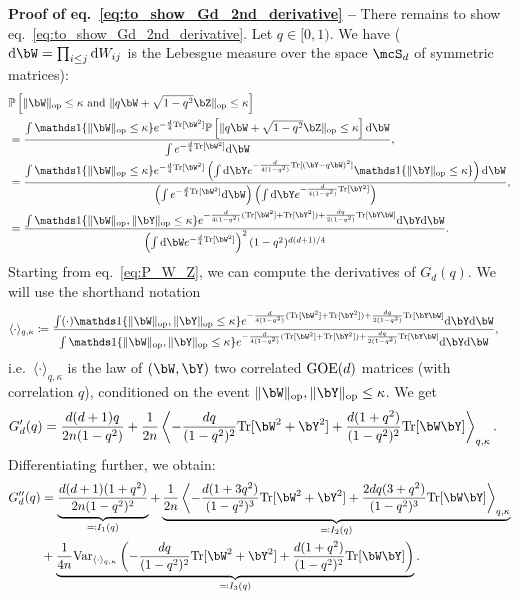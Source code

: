\myskip
\textbf{Proof of eq.~\eqref{eq:to_show_Gd_2nd_derivative} --}
There remains to show eq.~\eqref{eq:to_show_Gd_2nd_derivative}.
Let $q \in [0,1)$.
We have ($\rd \bW = \prod_{i \leq j} \rd W_{ij}$ is the Lebesgue measure over the space $\mcS_{d}$ of symmetric matrices):
\begin{align}
    \label{eq:P_W_Z}
    \nonumber
    &\bbP\left[\|\bW\|_\op \leq \kappa \textrm{ and } \|q \bW + \sqrt{1-q^2} \bZ\|_\op \leq \kappa\right] \\ 
    \nonumber
    &= \frac{\int \indi\{\|\bW\|_\op \leq \kappa\} e^{-\frac{d}{4} \Tr[\bW^2]} \bbP\left[\|q \bW + \sqrt{1-q^2} \bZ\|_\op \leq \kappa\right] \rd \bW}{\int  e^{-\frac{d}{4} \Tr[\bW^2]} \rd \bW}, \\
    \nonumber
    &= \frac{\int \indi\{\|\bW\|_\op \leq \kappa\} e^{-\frac{d}{4} \Tr[\bW^2]} \left(\int \rd \bY e^{-\frac{d}{4(1-q^2)}\Tr[(\bY - q \bW)^2]} \indi\{\|\bY\|_\op \leq \kappa\}\right) \rd \bW}{\left(\int  e^{-\frac{d}{4} \Tr[\bW^2]} \rd \bW\right) \left(\int \rd \bY e^{-\frac{d}{4(1-q^2)}\Tr[\bY^2]}\right)}, \\
    &= \frac{\int \indi\{\|\bW\|_\op, \|\bY\|_\op \leq \kappa\} e^{-\frac{d}{4(1-q^2)} (\Tr[\bW^2] + \Tr[\bY^2]) + \frac{dq}{2(1-q^2)} \Tr[\bY \bW]} \rd \bY \rd \bW}{\left(\int \rd \bW e^{-\frac{d}{4}\Tr[\bW^2]}\right)^2 (1-q^2)^{d(d+1)/4}}.
\end{align}
Starting from eq.~\eqref{eq:P_W_Z}, we can compute the derivatives of $G_d(q)$.
We will use the shorthand notation 
\begin{align}
    \label{eq:gibbs_q}
    \langle \cdot \rangle_{q,\kappa} &\coloneqq \frac{\int (\cdot) \indi\{\|\bW\|_\op, \|\bY\|_\op \leq \kappa\} e^{-\frac{d}{4(1-q^2)} (\Tr[\bW^2] + \Tr[\bY^2]) + \frac{dq}{2(1-q^2)} \Tr[\bY \bW]} \rd \bY \rd \bW}{\int \indi\{\|\bW\|_\op, \|\bY\|_\op \leq \kappa\} e^{-\frac{d}{4(1-q^2)} (\Tr[\bW^2] + \Tr[\bY^2]) + \frac{dq}{2(1-q^2)} \Tr[\bY \bW]} \rd \bY \rd \bW},
\end{align}
i.e.\ $\langle \cdot \rangle_{q,\kappa}$ is the law of $(\bW, \bY)$ two correlated $\mathrm{GOE}(d)$ matrices (with correlation $q$), conditioned on the event $\|\bW\|_\op, \|\bY\|_\op \leq \kappa$.
We get
\begin{align*}
    G_d'(q) &= \frac{d(d+1) q}{2n (1-q^2)} + \frac{1}{2n} \left\langle -\frac{dq}{(1-q^2)^2} \Tr[\bW^2+\bY^2] 
    + \frac{d(1+q^2)}{(1-q^2)^2} \Tr[\bW\bY]
    \right\rangle_{q,\kappa}.
\end{align*}
Differentiating further, we obtain:
\begin{align}\label{eq:d2G_dq2_1}
    \nonumber
    G_d''(q) &= \underbrace{\frac{d(d+1) (1+q^2)}{2n (1-q^2)^2}}_{\eqqcolon I_1(q)}
    + \underbrace{\frac{1}{2n} \left\langle -\frac{d(1+3q^2)}{(1-q^2)^3} \Tr[\bW^2+\bY^2] 
    + \frac{2dq(3+q^2)}{(1-q^2)^3} \Tr[\bW\bY] \right\rangle_{q,\kappa}}_{\eqqcolon I_2(q)} \\ 
    &+ \underbrace{\frac{1}{4n} \textrm{Var}_{\langle \cdot \rangle_{q,\kappa}} \left(-\frac{dq}{(1-q^2)^2} \Tr[\bW^2+\bY^2] 
    + \frac{d(1+q^2)}{(1-q^2)^2} \Tr[\bW\bY]\right)}_{\eqqcolon I_3(q)}.
\end{align}
